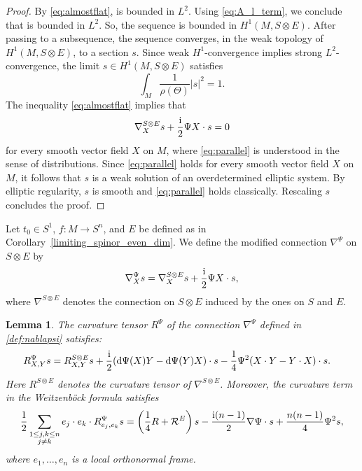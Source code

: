 \documentclass[11pt]{article}
\numberwithin{equation}{section}
\numberwithin{equation}{section}
\newtheorem{Lemma}[Theorem]{Lemma}
\newcommand{\id}{\mathrm{id}}
\begin{document}
\begin{proof}
By \eqref{eq:almostflat},  is bounded in $L^2$. Using \eqref{eq:A_l_term}, we conclude that \smash{$\nabla^{S \otimes E} \big(\big(\id \otimes \sigma^{(\ell)}\big) s^{(\ell)}\big)$} is bounded in $L^2$. So, the sequence \smash{$\big(\id \otimes \sigma^{(\ell)}\big) s^{(\ell)} \in C^\infty(M,S \otimes E)$} is bounded in $H^1(M,S \otimes E)$.
After passing to a subsequence, the sequence \smash{$\big(\id \otimes \sigma^{(\ell)}\big) s^{(\ell)} \in C^\infty(M,S \otimes E)$} converges, in the weak topology of $H^1(M,S \otimes E)$, to a section $s$.
Since weak $H^1$-convergence implies strong $L^2$-convergence, the limit $s \in H^1(M,S \otimes E)$ satisfies
\[
\int_M \frac{1}{\rho(\Theta)} |s|^2 = 1.
\]
The inequality \eqref{eq:almostflat} implies that
\begin{equation}
\nabla_X^{S \otimes E} s + \frac{\rm i}{2} \Psi X \cdot s = 0
\label{eq:parallel}
\end{equation}
for every smooth vector field $X$ on $M$, where \eqref{eq:parallel} is understood in the sense of distributions.
Since \eqref{eq:parallel} holds for every smooth vector field $X$ on $M$, it follows
that $s$ is a weak solution of an overdetermined elliptic system.
By elliptic regularity, $s$ is smooth and \eqref{eq:parallel} holds classically.
Rescaling $s$ concludes the proof.
\end{proof}

\begin{Definition}
Let $t_0 \in S^1$, $f\colon M \to S^n$, and $E$ be defined as in Corollary~\ref{limiting_spinor_even_dim}.
We define the modified connection $\nabla^\Psi$ on $S \otimes E $ by
\begin{equation}
\nabla_X^\Psi s = \nabla_X^{S \otimes E} s + \frac{\rm i}{2} \Psi X \cdot s,
\label{def:nablapsi}
\end{equation}
where $\nabla^{S \otimes E}$ denotes the connection on $S \otimes E$ induced by the ones on $S$ and $E$.
\end{Definition}

\begin{Lemma}
The curvature tensor $R^\Psi$ of the connection $\nabla^\Psi$ defined in \eqref{def:nablapsi} satisfies:
\begin{align}
R^\Psi_{X,Y}s
&=
R^{S\otimes E}_{X,Y}s + \frac{\rm i}{2} ({\rm d}\Psi(X)Y-{\rm d}\Psi(Y)X) \cdot s - \frac{1}{4} \Psi^2 (X\cdot Y-Y\cdot X)\cdot s .
\label{eq:RPsi}
\end{align}
Here $R^{S\otimes E}$ denotes the curvature tensor of $\nabla^{S\otimes E}$.
Moreover, the curvature term in the Weitzen\-b\"ock formula satisfies
\begin{align}
\frac{1}{2} \sum_{\substack{1\leq j,k\leq n\\ j \neq k}} e_j\cdot e_k\cdot R^\Psi_{e_j,e_k}s
=
\left(\frac{1}{4} R + \mathcal{R}^E\right)s - \frac{{\rm i}(n-1)}{2} \nabla\Psi\cdot s + \frac{n(n-1)}{4} \Psi^2 s,
\label{eq:Weitzenbock}
\end{align}
where $e_1,\dots,e_n$ is a local orthonormal frame.
\end{Lemma}
\end{document}
